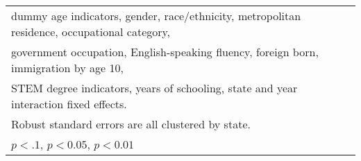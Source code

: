 \begin{table}[htbp]
\begin{tabular}{l*{5}{c}}
\multicolumn{6}{l}{\footnotesize dummy age indicators, gender, race/ethnicity, metropolitan residence, occupational category,}\\
\multicolumn{6}{l}{\footnotesize government occupation, English-speaking fluency, foreign born, immigration by age 10,}\\
\multicolumn{6}{l}{\footnotesize STEM degree indicators, years of schooling, state and year interaction fixed effects.}\\
\multicolumn{6}{l}{\footnotesize Robust standard errors are all clustered by state.}\\
\multicolumn{6}{l}{\footnotesize \sym{*} \(p<.1\), \sym{**} \(p<0.05\), \sym{***} \(p<0.01\)}\\
\end{tabular}
\end{table}
